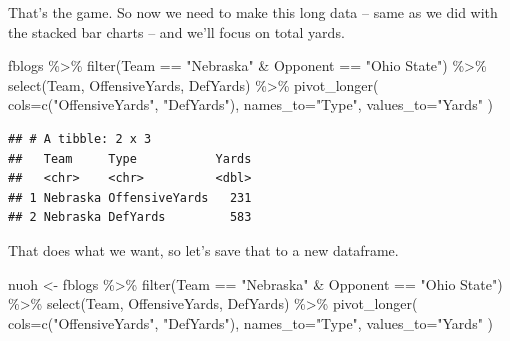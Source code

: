 \documentclass[
]{book}
\newenvironment{Shaded}{\begin{snugshade}}{\end{snugshade}}
\newcommand{\AttributeTok}[1]{\textcolor[rgb]{0.77,0.63,0.00}{#1}}
\newcommand{\FunctionTok}[1]{\textcolor[rgb]{0.00,0.00,0.00}{#1}}
\newcommand{\NormalTok}[1]{#1}
\newcommand{\OtherTok}[1]{\textcolor[rgb]{0.56,0.35,0.01}{#1}}
\newcommand{\SpecialCharTok}[1]{\textcolor[rgb]{0.00,0.00,0.00}{#1}}
\newcommand{\StringTok}[1]{\textcolor[rgb]{0.31,0.60,0.02}{#1}}
\begin{document}
That's the game. So now we need to make this long data -- same as we did with the stacked bar charts -- and we'll focus on total yards.

\begin{Shaded}
\begin{Highlighting}[]
\NormalTok{fblogs }\SpecialCharTok{\%\textgreater{}\%} 
        \FunctionTok{filter}\NormalTok{(Team }\SpecialCharTok{==} \StringTok{"Nebraska"} \SpecialCharTok{\&}\NormalTok{ Opponent }\SpecialCharTok{==} \StringTok{"Ohio State"}\NormalTok{) }\SpecialCharTok{\%\textgreater{}\%} 
        \FunctionTok{select}\NormalTok{(Team, OffensiveYards, DefYards) }\SpecialCharTok{\%\textgreater{}\%} 
        \FunctionTok{pivot\_longer}\NormalTok{(}
                \AttributeTok{cols=}\FunctionTok{c}\NormalTok{(}\StringTok{"OffensiveYards"}\NormalTok{, }\StringTok{"DefYards"}\NormalTok{), }
                \AttributeTok{names\_to=}\StringTok{"Type"}\NormalTok{, }
                \AttributeTok{values\_to=}\StringTok{"Yards"}
\NormalTok{                )}
\end{Highlighting}
\end{Shaded}

\begin{verbatim}
## # A tibble: 2 x 3
##   Team     Type           Yards
##   <chr>    <chr>          <dbl>
## 1 Nebraska OffensiveYards   231
## 2 Nebraska DefYards         583
\end{verbatim}

That does what we want, so let's save that to a new dataframe.

\begin{Shaded}
\begin{Highlighting}[]
\NormalTok{nuoh }\OtherTok{\textless{}{-}}\NormalTok{ fblogs }\SpecialCharTok{\%\textgreater{}\%} 
        \FunctionTok{filter}\NormalTok{(Team }\SpecialCharTok{==} \StringTok{"Nebraska"} \SpecialCharTok{\&}\NormalTok{ Opponent }\SpecialCharTok{==} \StringTok{"Ohio State"}\NormalTok{) }\SpecialCharTok{\%\textgreater{}\%} 
        \FunctionTok{select}\NormalTok{(Team, OffensiveYards, DefYards) }\SpecialCharTok{\%\textgreater{}\%} 
        \FunctionTok{pivot\_longer}\NormalTok{(}
                \AttributeTok{cols=}\FunctionTok{c}\NormalTok{(}\StringTok{"OffensiveYards"}\NormalTok{, }\StringTok{"DefYards"}\NormalTok{), }
                \AttributeTok{names\_to=}\StringTok{"Type"}\NormalTok{, }
                \AttributeTok{values\_to=}\StringTok{"Yards"}
\NormalTok{                )}
\end{Highlighting}
\end{Shaded}
\end{document}
